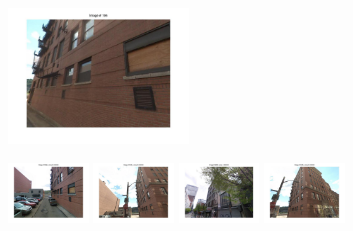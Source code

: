 \begin{figure}[t!]
        \begin{minipage}{0.34\linewidth}
            \centering
            \vspace{0mm}
            \includegraphics[trim = 45mm 40mm 45mm 30mm, clip=true, height=36mm]{imgs/Pval/exMix09/query.jpg}
        \end{minipage}
        \begin{minipage}{0.75\linewidth}
            \begin{minipage}{\linewidth} 
                \colorbox{myGreen}{\includegraphics[trim = 35mm 30mm 35mm 30mm, clip=true, height=16mm]{imgs/Pval/exMix09/mixPval01.jpg}}
                \colorbox{myGreen}{\includegraphics[trim = 35mm 30mm 35mm 30mm, clip=true, height=16mm]{imgs/Pval/exMix09/mixPval02.jpg}}
                \colorbox{myRed}{\includegraphics[trim = 35mm 30mm 35mm 30mm, clip=true, height=16mm]{imgs/Pval/exMix09/mixPval03.jpg}}
                \colorbox{myGreen}{\includegraphics[trim = 35mm 30mm 35mm 30mm, clip=true, height=16mm]{imgs/Pval/exMix09/mixPval04.jpg}}
            \end{minipage}
            \\

\end{minipage}
\end{figure}
